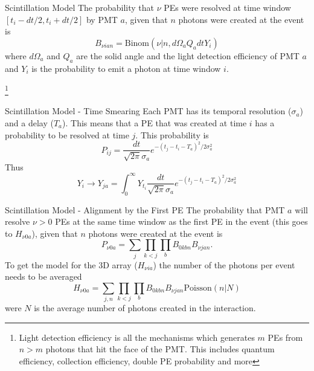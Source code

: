 \documentclass{beamer}
\newcommand\blfootnote[1]{%
  \begingroup
  \renewcommand\thefootnote{}\footnote{#1}%
  \addtocounter{footnote}{-1}%
  \endgroup
}
\begin{document}
\begin{frame}{Scintillation Model}
The probability that $\nu$ PEs were resolved at time window $[t_i-dt/2, t_i+dt/2]$ by PMT $a$, given that $n$ photons were created at the event is
\begin{equation}
B_{\nu ian}=\text{Binom}(\nu|n,d\Omega_aQ_adtY_{i})
\end{equation}
where $d\Omega_a$ and $Q_a$ are the solid angle and the light detection efficiency of PMT $a$ and $Y_i$ is the probability to emit a photon at time window $i$.

\blfootnote{Light detection efficiency is all the mechanisms which generates $m$ PEs from $n>m$ photons that hit the face of the PMT. This includes quantum efficiency, collection efficiency, double PE probability and more}
\end{frame}

\begin{frame}{Scintillation Model - Time Smearing}
Each PMT has its temporal resolution ($\sigma_a$) and a delay ($T_a$).
This means that a PE that was created at time $i$ has a probability to be resolved at time $j$. This probability is
\begin{equation}
P_{ij}=\frac{dt}{\sqrt{2\pi}\sigma_a}e^{-(t_j-t_i-T_a)^2/2\sigma_a^2}
\end{equation}
Thus
\begin{equation}
Y_i\rightarrow Y_{ja}=\int_0^{\infty}Y_{t_i}\frac{dt}{\sqrt{2\pi}\sigma_a}e^{-(t_j-t_i-T_a)^2/2\sigma_a^2}
\end{equation}

\end{frame}

\begin{frame}{Scintillation Model - Alignment by the First PE}
The probability that PMT $a$ will resolve $\nu>0$ PEs at the same time window as the first PE in the event (this goes to $H_{\nu0a}$), given that $n$ photons were created at the event is
\begin{equation}
P_{\nu0a}=\sum_j\prod_{k<j}\prod_bB_{0kbn}B_{\nu jan}.
\end{equation}
To get the model for the 3D array ($H_{\nu ia}$) the number of the photons per event needs to be averaged
\begin{equation}
H_{\nu0a}=\sum_{j,n}\prod_{k<j}\prod_bB_{0kbn}B_{\nu jan}\text{Poisson}(n|N)
\end{equation}
were $N$ is the average number of photons created in the interaction.
\end{frame}
\end{document}
